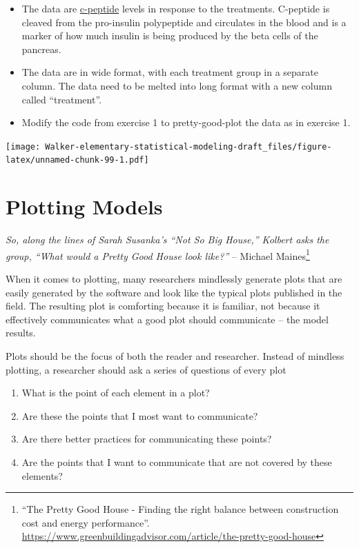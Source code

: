 \documentclass[]{book}
\providecommand{\tightlist}{%
  \setlength{\itemsep}{0pt}\setlength{\parskip}{0pt}}
\let\rmarkdownfootnote\footnote%
\def\footnote{\protect\rmarkdownfootnote}
\begin{document}
\begin{itemize}
\tightlist
\item
  The data are \href{https://en.wikipedia.org/wiki/C-peptide}{c-peptide} levels in response to the treatments. C-peptide is cleaved from the pro-insulin polypeptide and circulates in the blood and is a marker of how much insulin is being produced by the beta cells of the pancreas.
\item
  The data are in wide format, with each treatment group in a separate column. The data need to be melted into long format with a new column called ``treatment''.
\item
  Modify the code from exercise 1 to pretty-good-plot the data as in exercise 1.
\end{itemize}

\texttt{[image: Walker-elementary-statistical-modeling-draft\_files/figure-latex/unnamed-chunk-99-1.pdf]}

\hypertarget{plotting-models}{%
\chapter{Plotting Models}\label{plotting-models}}

\emph{So, along the lines of Sarah Susanka's ``Not So Big House,'' Kolbert asks the group, ``What would a Pretty Good House look like?''} -- Michael Maines\footnote{``The Pretty Good House - Finding the right balance between construction cost and energy performance''. \url{https://www.greenbuildingadvisor.com/article/the-pretty-good-house}}

When it comes to plotting, many researchers mindlessly generate plots that are easily generated by the software and look like the typical plots published in the field. The resulting plot is comforting because it is familiar, not because it effectively communicates what a good plot should communicate -- the model results.

Plots should be the focus of both the reader and researcher. Instead of mindless plotting, a researcher should ask a series of questions of every plot

\begin{enumerate}
\def\labelenumi{\arabic{enumi}.}
\tightlist
\item
  What is the point of each element in a plot?
\item
  Are these the points that I most want to communicate?
\item
  Are there better practices for communicating these points?
\item
  Are the points that I want to communicate that are not covered by these elements?
\end{enumerate}
\end{document}
